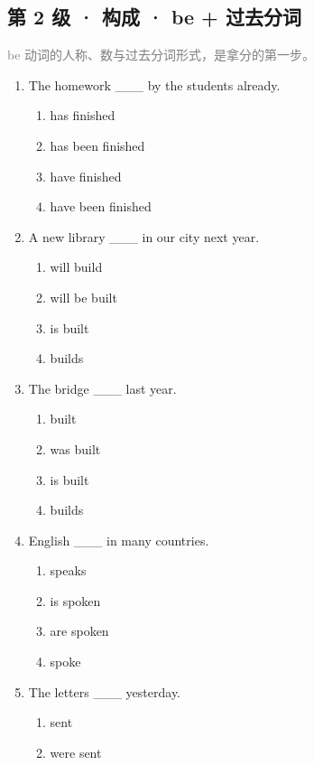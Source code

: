 \documentclass[11pt,a4paper]{ctexart}
\begin{document}
\subsection*{第 2 级 · 构成 · be + 过去分词}
\noindent\textcolor{gray}{be 动词的人称、数与过去分词形式，是拿分的第一步。}\par\smallskip
\begin{enumerate}[leftmargin=*,itemsep=4pt]
\item The homework \_\_\_ by the students already.
\begin{enumerate}[label=\Alph*.,leftmargin=2em,itemsep=1pt,topsep=2pt]
\item has finished
\item has been finished
\item have finished
\item have been finished
\end{enumerate}
\item A new library \_\_\_ in our city next year.
\begin{enumerate}[label=\Alph*.,leftmargin=2em,itemsep=1pt,topsep=2pt]
\item will build
\item will be built
\item is built
\item builds
\end{enumerate}
\item The bridge \_\_\_ last year.
\begin{enumerate}[label=\Alph*.,leftmargin=2em,itemsep=1pt,topsep=2pt]
\item built
\item was built
\item is built
\item builds
\end{enumerate}
\item English \_\_\_ in many countries.
\begin{enumerate}[label=\Alph*.,leftmargin=2em,itemsep=1pt,topsep=2pt]
\item speaks
\item is spoken
\item are spoken
\item spoke
\end{enumerate}
\item The letters \_\_\_ yesterday.
\begin{enumerate}[label=\Alph*.,leftmargin=2em,itemsep=1pt,topsep=2pt]
\item sent
\item were sent

\end{enumerate}
\end{enumerate}
\end{document}
